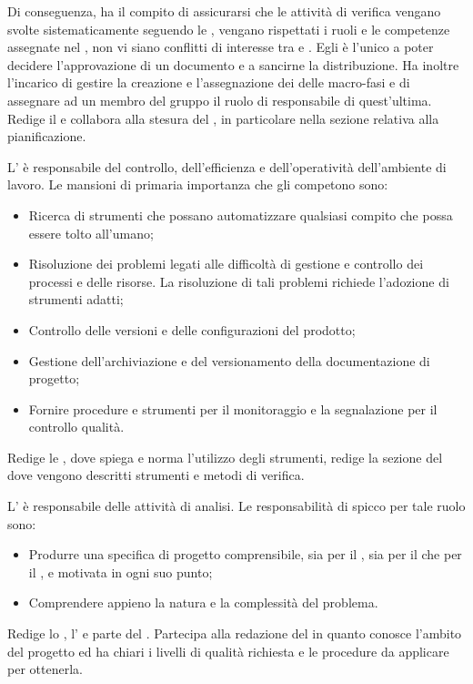 \documentclass[12pt,a4paper]{article}
\begin{document}
Di conseguenza, ha il compito di assicurarsi che le attività di verifica vengano svolte sistematicamente seguendo le \NdP, vengano rispettati i ruoli e le competenze assegnate nel \PdP{}, non vi siano conflitti di interesse tra  e . Egli è l'unico a poter decidere l'approvazione di un documento e a sancirne la distribuzione.
Ha inoltre l'incarico di gestire la creazione e l'assegnazione dei  delle macro-fasi e di assegnare ad un membro del gruppo il ruolo di responsabile di quest'ultima.
Redige il \PdP{} e collabora alla stesura del \PdQ{}, in particolare nella sezione relativa alla pianificazione.

L'\AM{} è responsabile del controllo, dell'efficienza e dell'operatività dell'ambiente di lavoro. Le mansioni di primaria importanza che gli competono sono:
\begin{itemize}
	\item Ricerca di strumenti che possano automatizzare qualsiasi compito che possa essere tolto all'umano;
	\item Risoluzione dei problemi legati alle difficoltà di gestione e controllo dei processi e delle risorse. La risoluzione di tali problemi richiede l'adozione di strumenti adatti;
	\item Controllo delle versioni e delle configurazioni del prodotto;
	\item Gestione dell'archiviazione e del versionamento della documentazione di progetto;
	\item Fornire procedure e strumenti per il monitoraggio e la segnalazione per il controllo qualità.
\end{itemize}
Redige le \NdP{}, dove spiega e norma l'utilizzo degli strumenti, redige la sezione del \PdQ{} dove vengono descritti strumenti e metodi di verifica.

L'\AN{} è responsabile delle attività di analisi. Le responsabilità di spicco per tale ruolo sono:
\begin{itemize}
	\item Produrre una specifica di progetto comprensibile, sia per il , sia per il  che per il \PG{}, e motivata in ogni suo punto;
	\item Comprendere appieno la natura e la complessità del problema.
\end{itemize}
Redige lo \SdF{}, l'\AdR{} e parte del \PdQ{}.
Partecipa alla redazione del \PdQ{} in quanto conosce l'ambito del progetto ed ha chiari i livelli di qualità richiesta e le procedure da applicare per ottenerla.
\end{document}
